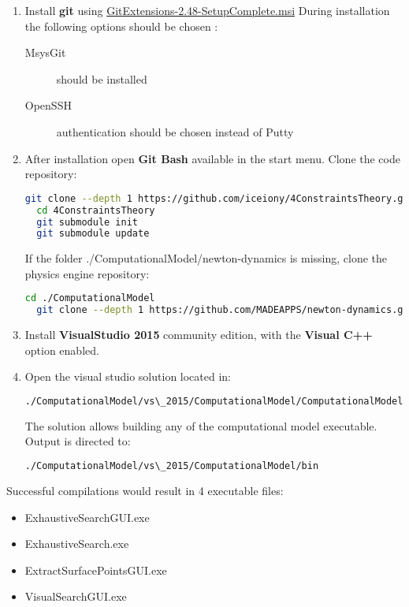 \documentclass[11]{article}
\begin{document}
\begin{enumerate}

  \item Install \textbf{git} using 
    \href{https://github.com/gitextensions/gitextensions/releases/latest}{GitExtensions-2.48-SetupComplete.msi} 
    During installation the following options should be chosen : 
    \begin{description}
	\item [MsysGit] should be installed 
	\item [OpenSSH] authentication should be chosen instead of Putty
    \end{description}

  \item After installation open \textbf{Git Bash} available in the start menu. Clone the code repository:   
    \begin{lstlisting}[language=bash]
  git clone --depth 1 https://github.com/iceiony/4ConstraintsTheory.git 
  cd 4ConstraintsTheory
  git submodule init
  git submodule update
    \end{lstlisting}

    If the folder ./ComputationalModel/newton-dynamics is missing, clone the physics engine repository:
    \begin{lstlisting}[language=bash]
  cd ./ComputationalModel
  git clone --depth 1 https://github.com/MADEAPPS/newton-dynamics.git 
    \end{lstlisting}

  \item Install \textbf{VisualStudio 2015} community edition, with the \textbf{Visual C++} option enabled. 
  
    \pagebreak
  \item Open the visual studio solution located in: 
    \nopagebreak
    \begin{lstlisting}[language=bash]
    ./ComputationalModel/vs\_2015/ComputationalModel/ComputationalModel.sln
    \end{lstlisting}
    \nopagebreak
    The solution allows building any of the computational model executable.
    Output is directed to:
    \begin{lstlisting}[language=bash]
    ./ComputationalModel/vs\_2015/ComputationalModel/bin
    \end{lstlisting}

\end{enumerate}

Successful compilations would result in 4 executable files: 
\begin{itemize}
  \item ExhaustiveSearchGUI.exe 
  \item ExhaustiveSearch.exe
  \item ExtractSurfacePointsGUI.exe  
  \item VisualSearchGUI.exe
\end{itemize}
\end{document}
